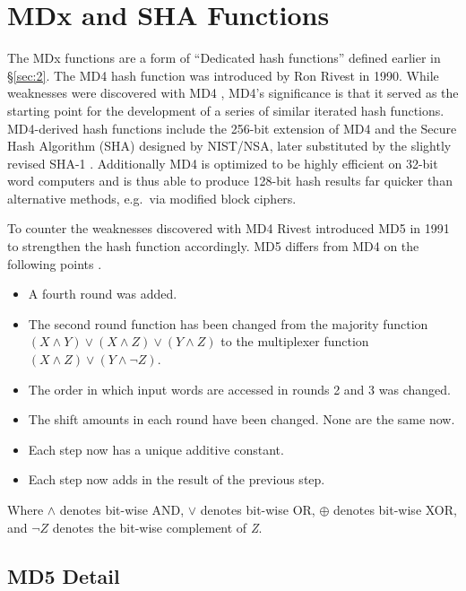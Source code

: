 \section{MDx and SHA Functions}\label{sec:3}

The MDx functions are a form of ``Dedicated hash functions'' defined
earlier in \S\ref{sec:2}. The MD4 \cite{ref21} hash
function was introduced by Ron Rivest in 1990. While weaknesses were
discovered with MD4
\cite{ref15}\cite{ref30}\cite{ref32},
MD4's significance is that it served as the starting point for the
development of a series of similar iterated hash functions. MD4-derived
hash functions include the 256-bit extension of MD4
\cite{ref23} and the Secure Hash Algorithm (SHA) designed by
NIST/NSA, later substituted by the slightly revised SHA-1
\cite{ref10}. Additionally MD4 is optimized to be highly
efficient on 32-bit word computers and is thus able to produce 128-bit
hash results far quicker than alternative methods, e.g.~via modified
block ciphers.

To counter the weaknesses discovered with MD4 Rivest introduced MD5
\cite{ref22} in 1991 to strengthen the hash function
accordingly. MD5 differs from MD4 on the following points
\cite{ref3}.

\begin{itemize}
\tightlist
\item
  A fourth round was added.
\item
  The second round function has been changed from the majority function
  \((X\land Y)\lor(X\land Z)\lor(Y\land Z)\) to the multiplexer function
  \((X\land Z)\lor(Y\land\neg Z).\)
\item
  The order in which input words are accessed in rounds 2 and 3 was
  changed.
\item
  The shift amounts in each round have been changed. None are the same
  now.
\item
  Each step now has a unique additive constant.
\item
  Each step now adds in the result of the previous step.
\end{itemize}

Where \(\land\) denotes bit-wise AND, \(\lor\) denotes bit-wise OR,
\(\oplus\) denotes bit-wise XOR, and \(\neg Z\) denotes the bit-wise
complement of \emph{Z}.

\subsection{MD5 Detail}\label{sec:3.1}\label{md5-detail}

